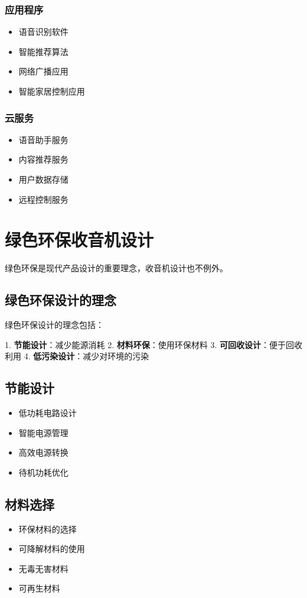 \documentclass[12pt,UTF8]{ctexbook}
\begin{document}
\subsection{应用程序}\begin{itemize}
  \item 语音识别软件
  \item 智能推荐算法
  \item 网络广播应用
  \item 智能家居控制应用\end{itemize}

\subsection{云服务}\begin{itemize}
  \item 语音助手服务
  \item 内容推荐服务
  \item 用户数据存储
  \item 远程控制服务\end{itemize}

\chapter{绿色环保收音机设计}

绿色环保是现代产品设计的重要理念，收音机设计也不例外。

\section{绿色环保设计的理念}

绿色环保设计的理念包括：

1. \textbf{节能设计}：减少能源消耗
2. \textbf{材料环保}：使用环保材料
3. \textbf{可回收设计}：便于回收利用
4. \textbf{低污染设计}：减少对环境的污染

\section{节能设计}\begin{itemize}
  \item 低功耗电路设计
  \item 智能电源管理
  \item 高效电源转换
  \item 待机功耗优化\end{itemize}

\section{材料选择}\begin{itemize}
  \item 环保材料的选择
  \item 可降解材料的使用
  \item 无毒无害材料
  \item 可再生材料\end{itemize}
\end{document}
